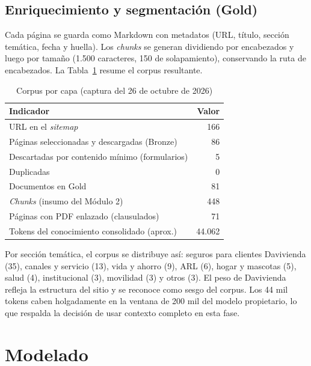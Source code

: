 \documentclass[journal]{IEEEtran}
\begin{document}
\subsection{Enriquecimiento y segmentación (Gold)}
Cada página se guarda como Markdown con metadatos (URL, título, sección temática, fecha y huella). Los \textit{chunks} se generan dividiendo por encabezados y luego por tamaño (1.500 caracteres, 150 de solapamiento), conservando la ruta de encabezados. La Tabla~\ref{tab:corpus} resume el corpus resultante.

\begin{table}[H]
\centering
\caption{Corpus por capa (captura del 26 de octubre de 2026)}
\label{tab:corpus}
\begin{tabular}{lr}
\hline
Indicador & Valor \\ \hline
URL en el \textit{sitemap} & 166 \\
Páginas seleccionadas y descargadas (Bronze) & 86 \\
Descartadas por contenido mínimo (formularios) & 5 \\
Duplicadas & 0 \\
Documentos en Gold & 81 \\
\textit{Chunks} (insumo del Módulo 2) & 448 \\
Páginas con PDF enlazado (clausulados) & 71 \\
Tokens del conocimiento consolidado (aprox.) & 44.062 \\ \hline
\end{tabular}
\end{table}

Por sección temática, el corpus se distribuye así: seguros para clientes Davivienda (35), canales y servicio (13), vida y ahorro (9), ARL (6), hogar y mascotas (5), salud (4), institucional (3), movilidad (3) y otros (3). El peso de Davivienda refleja la estructura del sitio y se reconoce como sesgo del corpus. Los 44 mil tokens caben holgadamente en la ventana de 200 mil del modelo propietario, lo que respalda la decisión de usar contexto completo en esta fase.

\section{Modelado}
\end{document}
